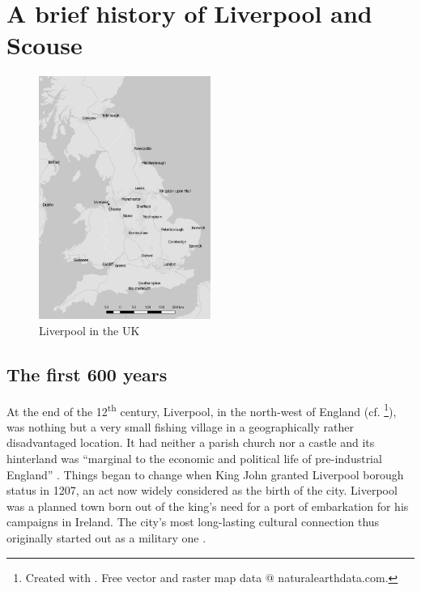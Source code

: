 \chapter{A brief history of Liverpool and Scouse}\label{ch.hist}

	\begin{figure}[h]
		\centering
 		\includegraphics[width=0.5\textwidth]{figures/Map-England.png}
		\caption{Liverpool in the UK}
		\label{fig.ex}
	\end{figure}

	\section{The first 600 years}\label{sec.hist.early}

At the end of the 12\textsuperscript{th} century, Liverpool, in the north-west of England (cf. \footnote{Created with \cite{QGIS2016}. Free vector and raster map data @ naturalearthdata.com.}), was nothing but a very small fishing village in a geographically rather disadvantaged location.
It had neither a parish church nor a castle and its hinterland was ``marginal to the economic and political life of pre-industrial England'' \citep[59]{kermodeetal2006}.
Things began to change when King John granted Liverpool borough status in 1207, an act now widely considered as the birth of the city. 
Liverpool was a planned town born out of the king's need for a port of embarkation for his campaigns in Ireland.
The city's most long-lasting cultural connection thus originally started out as a military one \parencite[cf.][59--63]{kermodeetal2006}.

